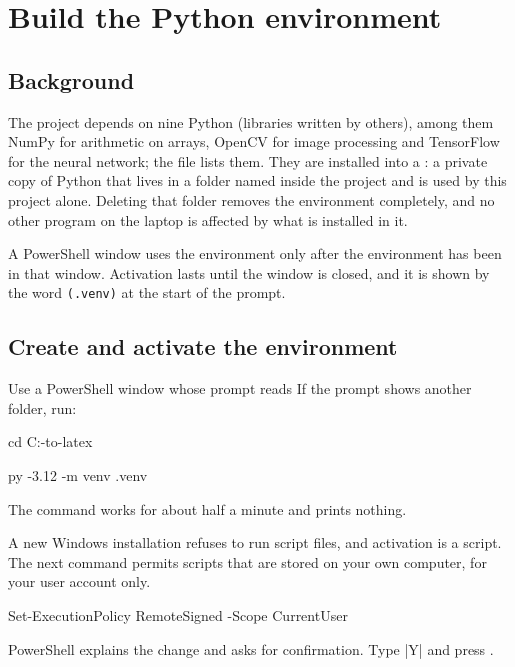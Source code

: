 \section{Build the Python environment}
\label{sec:python}

\subsection{Background}

The project depends on nine Python  (libraries written by others), among them
NumPy for arithmetic on arrays, OpenCV for image processing and TensorFlow for the neural
network; the file  lists them. They are installed into a : a private copy of Python that lives in a folder named  inside the
project and is used by this project alone. Deleting that folder removes the environment
completely, and no other program on the laptop is affected by what is installed in it.

A PowerShell window uses the environment only after the environment has been 
in that window. Activation lasts until the window is closed, and it is shown by the word
\texttt{(.venv)} at the start of the prompt.

\subsection{Create and activate the environment}

Use a PowerShell window whose prompt reads
\plainprompt
If the prompt shows another folder, run:
\begin{ps}
cd C:\camera-to-latex
\end{ps}

\begin{ps}
py -3.12 -m venv .venv
\end{ps}
The command works for about half a minute and prints nothing.

\label{st:policy}
A new Windows installation refuses to run script files, and activation is a script. The next
command permits scripts that are stored on your own computer, for your user account only.
\begin{ps}
Set-ExecutionPolicy RemoteSigned -Scope CurrentUser
\end{ps}
PowerShell explains the change and asks for confirmation. Type \code|Y| and press .

